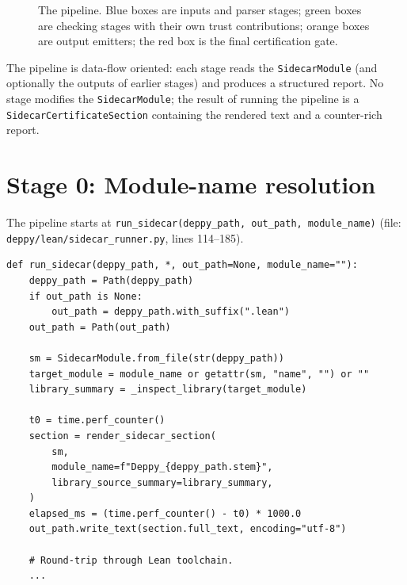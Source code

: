 \begin{figure}[h!]
\caption{The \Deppy{} pipeline.  Blue boxes are inputs and parser
stages; green boxes are checking stages with their own trust
contributions; orange boxes are output emitters; the red box is the
final certification gate.}
\label{fig:pipeline}
\end{figure}

The pipeline is data-flow oriented: each stage reads the
\texttt{SidecarModule} (and optionally the outputs of earlier
stages) and produces a structured report.  No stage modifies the
\texttt{SidecarModule}; the result of running the pipeline is a
\texttt{SidecarCertificateSection} containing the rendered \Lean{}
text and a counter-rich report.

\section{Stage 0: Module-name resolution}

The pipeline starts at \texttt{run\_sidecar(deppy\_path, out\_path,
module\_name)} (file: \texttt{deppy/lean/sidecar\_runner.py}, lines
114--185).

\begin{lstlisting}[caption={\texttt{run\_sidecar}: high-level control flow.}]
def run_sidecar(deppy_path, *, out_path=None, module_name=""):
    deppy_path = Path(deppy_path)
    if out_path is None:
        out_path = deppy_path.with_suffix(".lean")
    out_path = Path(out_path)

    sm = SidecarModule.from_file(str(deppy_path))
    target_module = module_name or getattr(sm, "name", "") or ""
    library_summary = _inspect_library(target_module)

    t0 = time.perf_counter()
    section = render_sidecar_section(
        sm,
        module_name=f"Deppy_{deppy_path.stem}",
        library_source_summary=library_summary,
    )
    elapsed_ms = (time.perf_counter() - t0) * 1000.0
    out_path.write_text(section.full_text, encoding="utf-8")

    # Round-trip through Lean toolchain.
    ...
\end{lstlisting}

